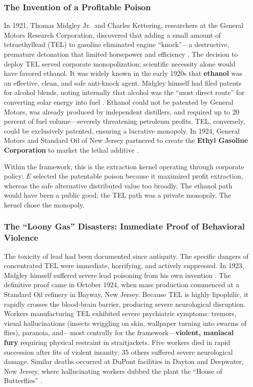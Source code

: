 \subsubsection{The Invention of a Profitable Poison}

In 1921, Thomas Midgley Jr.\ and Charles Kettering, researchers at the General Motors Research Corporation, discovered that adding a small amount of tetraethyllead (TEL) to gasoline eliminated engine ``knock''---a destructive, premature detonation that limited horsepower and efficiency \cite{tel_invention}. The decision to deploy TEL served corporate monopolization; scientific necessity alone would have favored ethanol. It was widely known in the early 1920s that \textbf{ethanol} was an effective, clean, and safe anti-knock agent. Midgley himself had filed patents for alcohol blends, noting internally that alcohol was the ``most direct route'' for converting solar energy into fuel \cite{tel_ethanol}. Ethanol could not be patented by General Motors, was already produced by independent distillers, and required up to 20 percent of fuel volume---severely threatening petroleum profits. TEL, conversely, could be exclusively patented, ensuring a lucrative monopoly. In 1924, General Motors and Standard Oil of New Jersey partnered to create the \textbf{Ethyl Gasoline Corporation} to market the lethal additive \cite{tel_ethyl}.

Within the framework, this is the extraction kernel operating through corporate policy: $E$ selected the patentable poison because it maximized profit extraction, whereas the safe alternative distributed value too broadly. The ethanol path would have been a public good; the TEL path was a private monopoly. The kernel chose the monopoly.

\subsubsection{The ``Loony Gas'' Disasters: Immediate Proof of Behavioral Violence}

The toxicity of lead had been documented since antiquity. The specific dangers of concentrated TEL were immediate, horrifying, and actively suppressed. In 1923, Midgley himself suffered severe lead poisoning from his own invention \cite{tel_loonygas}. The definitive proof came in October 1924, when mass production commenced at a Standard Oil refinery in Bayway, New Jersey. Because TEL is highly lipophilic, it rapidly crosses the blood-brain barrier, producing severe neurological disruption. Workers manufacturing TEL exhibited severe psychiatric symptoms: tremors, visual hallucinations (insects wriggling on skin, wallpaper turning into swarms of flies), paranoia, and---most centrally for the framework---\textbf{violent, maniacal fury} requiring physical restraint in straitjackets. Five workers died in rapid succession after fits of violent insanity; 35 others suffered severe neurological damage. Similar deaths occurred at DuPont facilities in Dayton and Deepwater, New Jersey, where hallucinating workers dubbed the plant the ``House of Butterflies'' \cite{tel_loonygas, tel_secret_history}.

